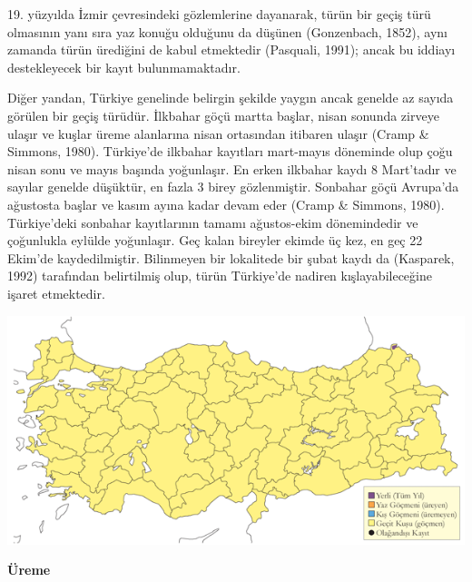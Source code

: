 \documentclass[
  a4paper,
  DIV=11,
  numbers=noendperiod]{scrreprt}
\begin{document}
19. yüzyılda İzmir çevresindeki gözlemlerine dayanarak, türün bir geçiş
türü olmasının yanı sıra yaz konuğu olduğunu da düşünen (Gonzenbach,
1852), aynı zamanda türün ürediğini de kabul etmektedir (Pasquali,
1991); ancak bu iddiayı destekleyecek bir kayıt bulunmamaktadır.

Diğer yandan, Türkiye genelinde belirgin şekilde yaygın ancak genelde az
sayıda görülen bir geçiş türüdür. İlkbahar göçü martta başlar, nisan
sonunda zirveye ulaşır ve kuşlar üreme alanlarına nisan ortasından
itibaren ulaşır (Cramp \& Simmons, 1980). Türkiye'de ilkbahar kayıtları
mart-mayıs döneminde olup çoğu nisan sonu ve mayıs başında yoğunlaşır.
En erken ilkbahar kaydı 8 Mart'tadır ve sayılar genelde düşüktür, en
fazla 3 birey gözlenmiştir. Sonbahar göçü Avrupa'da ağustosta başlar ve
kasım ayına kadar devam eder (Cramp \& Simmons, 1980). Türkiye'deki
sonbahar kayıtlarının tamamı ağustos-ekim dönemindedir ve çoğunlukla
eylülde yoğunlaşır. Geç kalan bireyler ekimde üç kez, en geç 22 Ekim'de
kaydedilmiştir. Bilinmeyen bir lokalitede bir şubat kaydı da (Kasparek,
1992) tarafından belirtilmiş olup, türün Türkiye'de nadiren
kışlayabileceğine işaret etmektedir.

\includegraphics{images/harita_Page_116.png}

\textbf{Üreme}
\end{document}
